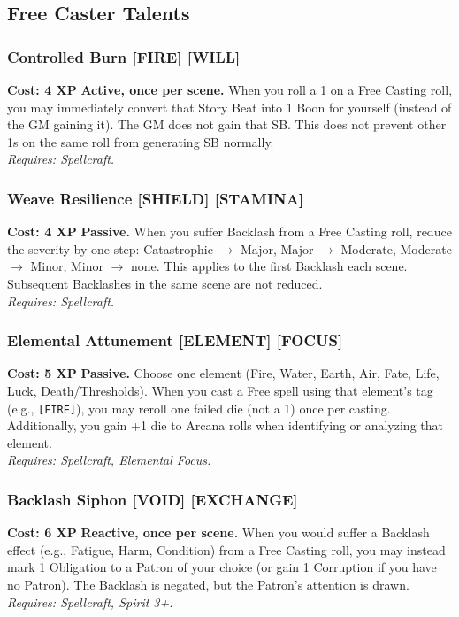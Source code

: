 \subsection*{Free Caster Talents}
\label{sec:major-freecaster}

\subsubsection*{Controlled Burn \textnormal{[FIRE] [WILL]}}
\label{talent:controlled-burn}
\textbf{Cost: 4 XP} \textbf{Active, once per scene.} When you roll a 1 on a Free Casting roll, you may immediately convert that Story Beat into 1 Boon for yourself (instead of the GM gaining it). The GM does not gain that SB. This does not prevent other 1s on the same roll from generating SB normally. \\
\textit{Requires: Spellcraft.}

\subsubsection*{Weave Resilience \textnormal{[SHIELD] [STAMINA]}}
\label{talent:weave-resilience}
\textbf{Cost: 4 XP} \textbf{Passive.} When you suffer Backlash from a Free Casting roll, reduce the severity by one step: Catastrophic $\rightarrow$ Major, Major $\rightarrow$ Moderate, Moderate $\rightarrow$ Minor, Minor $\rightarrow$ none. This applies to the first Backlash each scene. Subsequent Backlashes in the same scene are not reduced. \\
\textit{Requires: Spellcraft.}

\subsubsection*{Elemental Attunement \textnormal{[ELEMENT] [FOCUS]}}
\label{talent:elemental-attunement}
\textbf{Cost: 5 XP} \textbf{Passive.} Choose one element (Fire, Water, Earth, Air, Fate, Life, Luck, Death/Thresholds). When you cast a Free spell using that element's tag (e.g., \texttt{[FIRE]}), you may reroll one failed die (not a 1) once per casting. Additionally, you gain +1 die to Arcana rolls when identifying or analyzing that element. \\
\textit{Requires: Spellcraft, Elemental Focus.}

\subsubsection*{Backlash Siphon \textnormal{[VOID] [EXCHANGE]}}
\label{talent:backlash-siphon}
\textbf{Cost: 6 XP} \textbf{Reactive, once per scene.} When you would suffer a Backlash effect (e.g., Fatigue, Harm, Condition) from a Free Casting roll, you may instead mark 1 Obligation to a Patron of your choice (or gain 1 Corruption if you have no Patron). The Backlash is negated, but the Patron's attention is drawn. \\
\textit{Requires: Spellcraft, Spirit 3+.}


